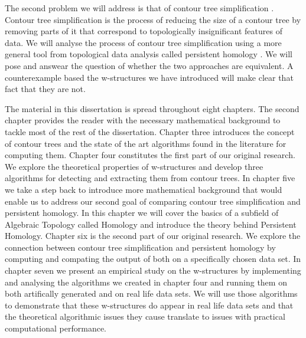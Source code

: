 The second problem we will address is that of contour tree simplification \cite{ct-branch-decomp}. Contour tree simplification is the process of reducing the size of a contour tree by removing parts of it that correspond to topologically insignificant  features of data. We will analyse the process of contour tree simplification using a more general tool from topological data analysis called persistent homology \cite{ph-a-survey}. We will pose and answear the question of whether the two approaches are equivalent. A counterexample based the w-structures we have introduced will make clear that fact that they are not.


The material in this dissertation is spread throughout eight chapters. The second chapter provides the reader with the necessary mathematical background to tackle most of the rest of the dissertation. Chapter three introduces the concept of contour trees and the state of the art algorithms found in the literature for computing them. Chapter four constitutes the first part of our original research. We explore the theoretical properties of w-structures and develop three algorithms for detecting and extracting them from contour trees. In chapter five we take a step back to introduce more mathematical background that would enable us to address our second goal of comparing contour tree simplification and persistent homology. In this chapter we will cover the basics of a subfield of Algebraic Topology called Homology and introduce the theory behind Persistent Homology. Chapter six is the second part of our original research. We explore the connection between contour tree simplification and persistent homology by computing and compating the output of both on a specifically chosen data set. In chapter seven we present an empirical study on the w-structures by implementing and analysing the algorithms we created in chapter four and running them on both artifically generated and on real life data sets. We will use those algorithms to demonstrate that these w-structures do appear in real life data sets and that the theoretical algorithmic issues they cause translate to issues with practical computational performance.
